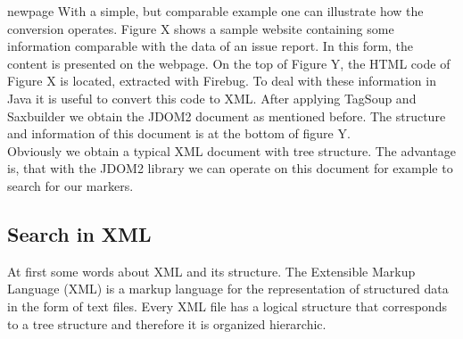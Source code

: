 newpage With a simple, but comparable example one can illustrate how the conversion operates. Figure X shows a sample website containing some information comparable with the data of an issue report. In this form, the content is presented on the webpage. On the top of Figure Y, the HTML code of Figure X is located, extracted with Firebug. To deal with these information in Java it is useful to convert this code to XML. After applying TagSoup and Saxbuilder we obtain the JDOM2 document as mentioned before. The structure and information of this document is at the bottom of figure Y.\\ Obviously we obtain a typical XML document with tree structure. The advantage is, that with the JDOM2 library we can operate on this document for example to search for our markers. 


\subsection{Search in XML}
At first some words about XML and its structure. The Extensible Markup Language (XML) is a markup language for the representation of structured data in the form of text files. Every XML file has a logical structure that corresponds to a tree structure and therefore it is organized hierarchic.
